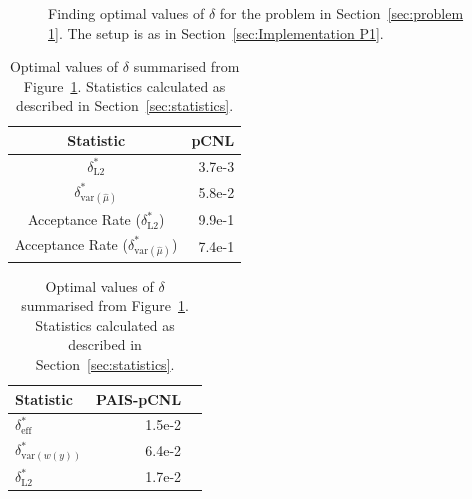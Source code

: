 \documentclass[final]{siamltex}
\begin{document}
\begin{figure}[htb]
\centering
{}
\caption{Finding optimal values of $\delta$ for the problem in Section~\ref{sec:problem 1}. The setup is as in Section~\ref{sec:Implementation P1}.}
\label{fig:P1 opt delta}
\end{figure}

\begin{table}[!htb]
    \begin{minipage}{.5\linewidth}
      \centering
        \begin{tabular}{|c|r|}
	\hline
	Statistic											& pCNL \\ \hline
	$\delta_{\text{L2}}^*$								& 3.7e-3 \\
	$\delta_{\text{var}(\hat{\mu})}^*$					& 5.8e-2 \\
	Acceptance Rate ($\delta_{\text{L2}}^*$)				& 9.9e-1 \\
	Acceptance Rate ($\delta_{\text{var}(\hat{\mu})}^*$)	& 7.4e-1 \\
	\hline
	\end{tabular}
    \end{minipage}%
    \begin{minipage}{.5\linewidth}
      \centering
        \begin{tabular}{|l|r|r|}
	\hline
	Statistic							& PAIS-pCNL \\ \hline
	$\delta_{\text{eff}}^*$				& 1.5e-2 \\
	$\delta_{\text{var}(w(y))}^*$		& 6.4e-2 \\
	$\delta_{\text{L2}}^*$				& 1.7e-2 \\
	\hline
	\end{tabular}
    \end{minipage}
	\vspace{1mm}
	\caption{Optimal values of $\delta$ summarised from Figure~\ref{fig:P1 opt delta}. Statistics calculated as described in Section~\ref{sec:statistics}.}
	\label{table:prob1 opt delta}
\end{table}
\end{document}
